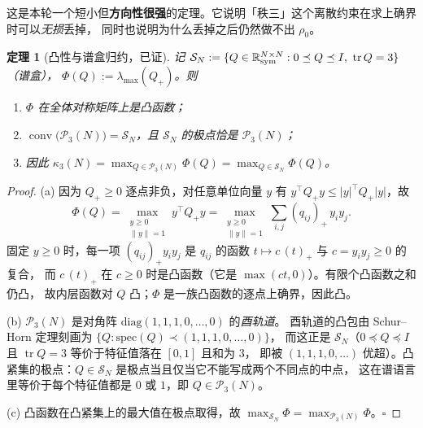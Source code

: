 \documentclass[UTF8,11pt]{ctexart}
\newtheorem{theorem}{定理}[section]
\theoremstyle{definition}
\newcommand{\tr}{\operatorname{tr}}
\newcommand{\R}{\mathbb{R}}
\begin{document}
这是本轮一个短小但\textbf{方向性很强}的定理。它说明「秩三」这个离散约束在求上确界时可以\emph{无损}丢掉，
同时也说明为什么丢掉之后仍然做不出 $\rho_0$。

\begin{theorem}[凸性与谱盒归约，已证]\label{thm:convex}
记 $\mathcal S_N:=\{Q\in\R^{N\times N}_{\rm sym}:0\preceq Q\preceq I,\ \tr Q=3\}$（谱盒），
$\Phi(Q):=\lambda_{\max}(Q_+)$。则
\begin{enumerate}[label=(\alph*),leftmargin=2.2em]
\item $\Phi$ 在\emph{全体}对称矩阵上是凸函数；
\item $\operatorname{conv}\bigl(\mathcal P_3(N)\bigr)=\mathcal S_N$，且 $\mathcal S_N$ 的极点恰是 $\mathcal P_3(N)$；
\item 因此 $\kappa_3(N)=\max_{Q\in\mathcal P_3(N)}\Phi(Q)=\max_{Q\in\mathcal S_N}\Phi(Q)$。
\end{enumerate}
\end{theorem}

\begin{proof}
(a) 因为 $Q_+\ge0$ 逐点非负，对任意单位向量 $y$ 有 $y^\top Q_+y\le|y|^\top Q_+|y|$，故
\[
\Phi(Q)=\max_{\substack{y\ge0\\ \|y\|=1}}y^\top Q_+y=\max_{\substack{y\ge0\\ \|y\|=1}}\sum_{i,j}(q_{ij})_+\,y_iy_j .
\]
固定 $y\ge0$ 时，每一项 $(q_{ij})_+y_iy_j$ 是 $q_{ij}$ 的函数 $t\mapsto c\,(t)_+$ 与 $c=y_iy_j\ge0$ 的复合，
而 $c\,(t)_+$ 在 $c\ge0$ 时是凸函数（它是 $\max(ct,0)$）。有限个凸函数之和仍凸，
故内层函数对 $Q$ 凸；$\Phi$ 是一族凸函数的逐点上确界，因此凸。

(b) $\mathcal P_3(N)$ 是对角阵 $\mathrm{diag}(1,1,1,0,\dots,0)$ 的\emph{酉轨道}。
酉轨道的凸包由 Schur--Horn 定理刻画为 $\{Q:\mathrm{spec}(Q)\prec(1,1,1,0,\dots,0)\}$，
而这正是 $\mathcal S_N$（$0\preceq Q\preceq I$ 且 $\tr Q=3$ 等价于特征值落在 $[0,1]$ 且和为 $3$，
即被 $(1,1,1,0,\dots)$ 优超）。凸紧集的极点：$Q\in\mathcal S_N$ 是极点当且仅当它不能写成两个不同点的中点，
这在谱语言里等价于每个特征值都是 $0$ 或 $1$，即 $Q\in\mathcal P_3(N)$。

(c) 凸函数在凸紧集上的最大值在极点取得，故 $\max_{\mathcal S_N}\Phi=\max_{\mathcal P_3(N)}\Phi$。$\square$
\end{proof}
\end{document}

